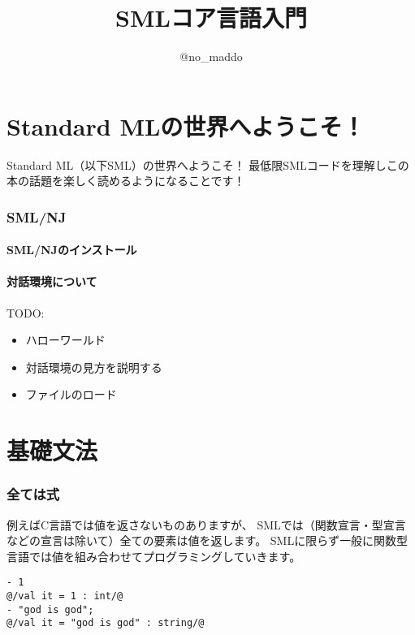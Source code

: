 \documentclass[11pt,a4paper]{article}
\title{SMLコア言語入門}
\author{@no\_maddo}
\begin{document}
\maketitle
\tableofcontents

\part{Standard MLの世界へようこそ！}
Standard ML（以下SML）の世界へようこそ！
最低限SMLコードを理解しこの本の話題を楽しく読めるようになることです！
\section{SML/NJ}
\subsection{SML/NJのインストール}
\subsection{対話環境について}
TODO:
\begin{itemize}
\item ハローワールド
\item 対話環境の見方を説明する
\item ファイルのロード
\end{itemize}

\subsection{}

\part{基礎文法}

\section{全ては式}

例えばC言語では値を返さないものありますが、
SMLでは（関数宣言・型宣言などの宣言は除いて）全ての要素は値を返します。
SMLに限らず一般に関数型言語では値を組み合わせてプログラミングしていきます。

\begin{lstlisting}[caption=全ては値！,label=code:values]
- 1
@/val it = 1 : int/@
- "god is god";
@/val it = "god is god" : string/@
\end{lstlisting}
\end{document}

